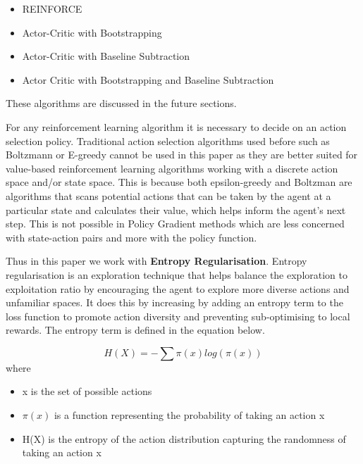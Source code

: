 \documentclass{article}
\begin{document}
\begin{itemize}[itemsep=0pt]
\item REINFORCE
\item Actor-Critic with Bootstrapping
\item Actor-Critic with Baseline Subtraction
\item Actor Critic with Bootstrapping and Baseline Subtraction
\end{itemize}
These algorithms are discussed in the future sections. 

\par For any reinforcement learning algorithm it is necessary to decide on an action selection policy. Traditional action selection algorithms used before such as Boltzmann or E-greedy cannot be used in this paper as they are better suited for value-based reinforcement learning algorithms working with a discrete action space and/or state space. This is because both epsilon-greedy and Boltzman are algorithms that scans potential actions that can be taken by the agent at a particular state and calculates their value, which helps inform the agent's next step. This is not possible in Policy Gradient methods which are less concerned with state-action pairs and more with the policy function. 
\par Thus in this paper we work with \textbf{Entropy Regularisation}. Entropy regularisation is an exploration technique that helps balance the exploration to exploitation ratio by encouraging the agent to explore more diverse actions and unfamiliar spaces. It does this by increasing by adding an entropy term to the loss function to promote action diversity and preventing sub-optimising to local rewards. The entropy term is defined in the equation below. %

\begin{equation*}
H(X) = - \sum \pi(x) log(\pi(x)) %
\end{equation*}
where
\begin{itemize}
\renewcommand\labelitemi{.}
\item x is the set of possible actions
\item $\pi(x)$ is a function representing the probability of taking an action x
\item H(X) is the entropy of the action distribution capturing the randomness of taking an action x
\end{itemize}
\end{document}
